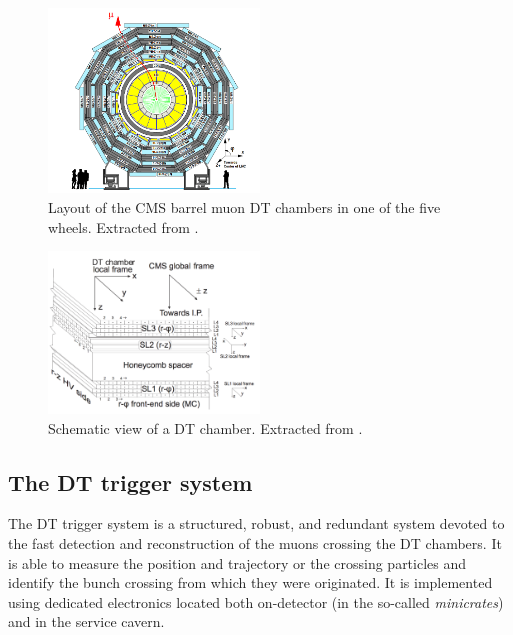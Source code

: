\documentclass[../main.tex]{subfiles}
\begin{document}
\begin{figure}
\begin{center}
\includegraphics[width=0.5\textwidth]{Images/dtwheel.png}
\end{center}
\caption[CMS barrel muon Drift Tube chambers layout]{Layout of the CMS barrel muon DT chambers in one of the five wheels. Extracted from \cite{intro:exp:cms}.}
\label{intro:fig:dtwheel}
\end{figure}

\begin{figure}
\begin{center}
\includegraphics[width=0.5\textwidth]{Images/DT_Chamber.png}
\end{center}
\caption[DT Chamber structure]{Schematic view of a DT chamber. Extracted from \cite{intro:exp:dt_calib}.}
\label{intro:fig:dtchamber}
\end{figure}

\subsection{The DT trigger system}

The DT trigger system is a structured, robust, and redundant system devoted to the fast detection and reconstruction of the muons crossing the DT chambers. It is able to measure the position and trajectory or the crossing particles and identify the bunch crossing from which they were originated. It is implemented using dedicated electronics located both on-detector (in the so-called \textit{minicrates}) and in the service cavern.
\end{document}
